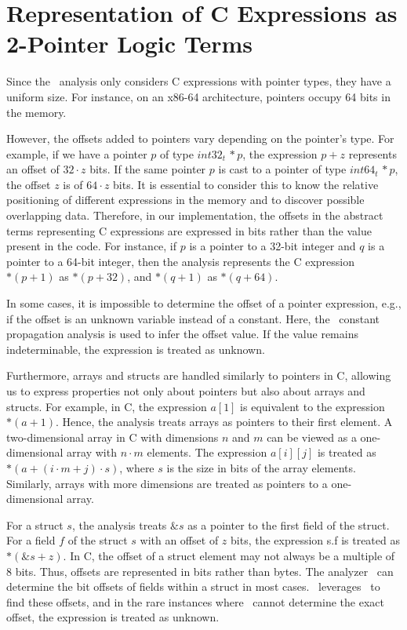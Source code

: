 

\section{Representation of C Expressions as 2-Pointer Logic Terms}

Since the \cpo\ analysis only considers C expressions with pointer types, they have a uniform size.
For instance, on an x86-64 architecture, pointers occupy 64 bits in the memory.

However, the offsets added to pointers vary depending on the pointer's type.
For example, if we have a pointer $p$ of type $int32_t\,*p$, the expression $p + z$ represents an offset of $32 \cdot z$ bits.
If the same pointer $p$ is cast to a pointer of type $int64_t\,*p$, the offset $z$ is of $64 \cdot z$ bits.
It is essential to consider this to know the relative positioning of
different expressions in the memory and to discover possible overlapping data.
Therefore, in our implementation, the offsets in the abstract terms representing C expressions are expressed in bits rather than the value present in the code.
For instance, if $p$ is a pointer to a 32-bit integer and $q$ is a pointer to a 64-bit integer, then the analysis represents the C expression $*(p + 1)$ as $*(p + 32)$, and $*(q + 1)$ as $*(q + 64)$.

In some cases, it is impossible to determine the offset of a pointer expression, e.g., if the offset is an unknown variable instead of a constant.
Here, the \goblint\ constant propagation analysis is used to infer the offset value.
If the value remains indeterminable, the expression is treated as unknown.

Furthermore, arrays and structs are handled similarly to pointers in C, allowing us to express properties not only about pointers but also about arrays and structs.
For example, in C, the expression $a[1]$ is equivalent to the expression $*(a + 1)$.
Hence, the analysis treats arrays as pointers to their first element.
A two-dimensional array in C with dimensions $n$ and $m$ can be viewed as a one-dimensional array with $n \cdot m$ elements.
The expression $a[i][j]$ is treated as $*(a + (i \cdot m + j) \cdot s)$, where $s$ is the size in bits of the array elements.
Similarly, arrays with more dimensions are treated as pointers to a one-dimensional array.

For a struct $s$, the analysis treats $\&s$ as a pointer to the first field of the struct.
For a field $f$ of the struct $s$ with an offset of $z$ bits,
the expression \textsf{s.f} is treated as $*(\&s + z)$.
In C, the offset of a struct element may not always be a multiple of 8 bits.
Thus, offsets are represented in bits rather than bytes.
The analyzer \goblint\ can determine the bit offsets of fields within a struct in most cases.
\cpo\ leverages \goblint\ to find these offsets, and in the rare instances where \goblint\ cannot determine the exact offset, the expression is treated as unknown.


